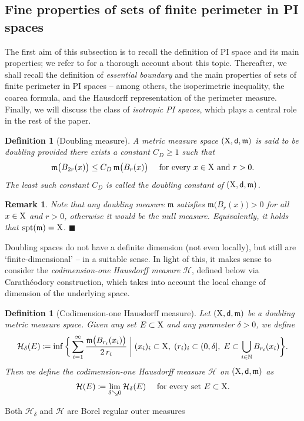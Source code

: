 \documentclass[reqno]{amsart}
\numberwithin{equation}{section}
\newcommand{\N}{\mathbb{N}}
\newcommand{\X}{{\rm X}}
\newcommand{\sfd}{{\sf d}}
\newcommand{\mm}{\mathfrak m}
\newcommand{\1}{\mathbbm 1}
\renewcommand{\H}{{\mathcal H}}
\newcommand{\fr}{\penalty-20\null\hfill\(\blacksquare\)}
\newtheorem{definition}[theorem]{Definition}
\newtheorem{remark}[theorem]{Remark}
\begin{document}
\subsection{Fine properties of sets of finite perimeter in PI spaces}
%
%
The first aim of this subsection is to recall the definition of PI space
and its main properties; we refer to \cite{HKST15} for a thorough
account about this topic. Thereafter, we shall recall the definition
of \emph{essential boundary} and the main properties of
sets of finite perimeter in PI spaces -- among others, the isoperimetric
inequality, the coarea formula, and the Hausdorff representation of the
perimeter measure. Finally, we will discuss the class of \emph{isotropic PI spaces},
which plays a central role in the rest of the paper.
%
%
\begin{definition}[Doubling measure]
A metric measure space \((\X,\sfd,\mm)\) is said to be \emph{doubling}
provided there exists a constant \(C_D\geq 1\) such that
\[
\mm\big(B_{2r}(x)\big)\leq C_D\,\mm\big(B_r(x)\big)
\quad\text{ for every }x\in\X\text{ and }r>0.
\]
The least such constant \(C_D\) is called the \emph{doubling constant}
of \((\X,\sfd,\mm)\).
\end{definition}
%
%
\begin{remark}{\rm
Note that any doubling measure \(\mm\) satisfies
\(\mm\big(B_r(x)\big)>0\) for all \(x\in\X\) and \(r>0\),
otherwise it would be the null measure. Equivalently,
it holds that \({\rm spt}(\mm)=\X\).
\fr}\end{remark}
%
%
Doubling spaces do not have a definite dimension (not even locally),
but still are `finite-dimensional' -- in a suitable sense. In light
of this, it makes sense to consider the \emph{codimension-one Hausdorff measure}
\(\H\), defined below via Carath\'{e}odory construction, which takes
into account the local change of dimension of the underlying space.
%
%
\begin{definition}[Codimension-one Hausdorff measure]
Let \((\X,\sfd,\mm)\) be a doubling metric measure space.
Given any set \(E\subset\X\) and any parameter \(\delta>0\), we define
\[
\H_\delta(E)\coloneqq\inf\bigg\{\sum_{i=1}^\infty
\frac{\mm\big(B_{r_i}(x_i)\big)}{2\,r_i}\;\bigg|
\;(x_i)_i\subset\X,\;(r_i)_i\subset(0,\delta],\;
E\subset\bigcup_{i\in\N}B_{r_i}(x_i)\bigg\}.
\]
Then we define the \emph{codimension-one Hausdorff measure} \(\H\)
on \((\X,\sfd,\mm)\) as
\[
\H(E)\coloneqq\lim_{\delta\searrow 0}\H_\delta(E)
\quad\text{ for every set }E\subset\X.
\]
\end{definition}
%
%
Both \(\H_\delta\) and \(\H\) are Borel regular outer measures
\end{document}
